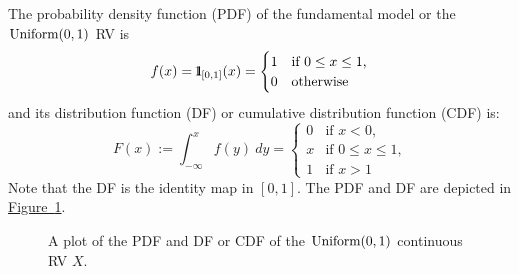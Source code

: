 \begin{model}\label{M:Uniform01}
The probability density function (PDF) of the fundamental model or the $\mbox{{\rm Uniform}}(0,1)$ RV is
\begin{equation}\label{E:Uniform01pdf}
f(x) = {1}\mspace{-11 mu}{1}_{[0,1]}(x) = 
\begin{cases}
1 & \text{if $0 \leq x \leq 1$,}\\
0 & \text{otherwise}
\end{cases}
\end{equation}
and its distribution function (DF) or cumulative distribution function (CDF) is:
\begin{equation}\label{E:Uniform01DF}
F(x) := \int_{- \infty}^x f(y) \ dy =
\begin{cases}
0 & \text{if $x < 0$,} \\
x & \text{if $0 \leq x \leq 1$,}\\
1 & \text{if $x > 1$} 
\end{cases}
\end{equation}
Note that the DF is the identity map in $[0,1]$.  The PDF and DF are depicted in \hyperref[F:unif01]{Figure~\ref*{F:unif01}}.
\begin{figure}[htpb]
\caption{A plot of the PDF and DF or CDF of the $\mbox{{\rm Uniform}}(0,1)$ continuous RV $X$.\label{F:unif01}}
\centering   {}
\end{figure}
\end{model}

